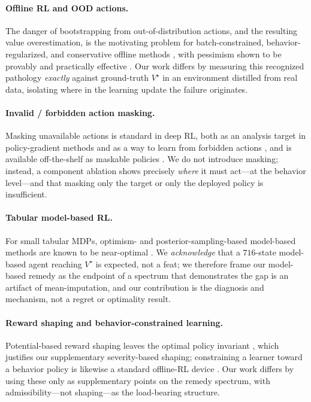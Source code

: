 \documentclass{article}
\begin{document}
\paragraph{Offline RL and OOD actions.}
The danger of bootstrapping from out-of-distribution actions, and the resulting
value overestimation, is the motivating problem for batch-constrained,
behavior-regularized, and conservative offline methods
\citep{fujimoto2019bcq,kumar2019bear,kumar2020cql}, with pessimism shown to be
provably and practically effective \citep{rashidinejad2021pessimism,jin2021pessimism}.
Our work differs by measuring this recognized pathology \emph{exactly} against
ground-truth $V^\star$ in an environment distilled from real data, isolating where
in the learning update the failure originates.

\paragraph{Invalid / forbidden action masking.}
Masking unavailable actions is standard in deep RL, both as an analysis target in
policy-gradient methods \citep{huang2021masking} and as a way to learn from
forbidden actions \citep{seurin2020forbidden}, and is available off-the-shelf as
maskable policies \citep{raffin2021sb3}. We
do not introduce masking; instead, a component ablation shows precisely \emph{where}
it must act---at the behavior level---and that masking only the target or only the
deployed policy is insufficient.

\paragraph{Tabular model-based RL.}
For small tabular MDPs, optimism- and posterior-sampling-based model-based methods
are known to be near-optimal \citep{auer2008ucrl,osband2013psrl}. We
\emph{acknowledge} that a $716$-state model-based agent reaching $V^\star$ is
expected, not a feat; we therefore frame our model-based remedy as the endpoint of
a spectrum that demonstrates the gap is an artifact of mean-imputation, and our
contribution is the diagnosis and mechanism, not a regret or optimality result.

\paragraph{Reward shaping and behavior-constrained learning.}
Potential-based reward shaping leaves the optimal policy invariant
\citep{ng1999reward}, which justifies our supplementary severity-based shaping;
constraining a learner toward a behavior policy is likewise a standard offline-RL
device \citep{wu2019behavior,nair2020awac}.
Our work differs by using these only as supplementary points on the remedy
spectrum, with admissibility---not shaping---as the load-bearing structure.
\end{document}
